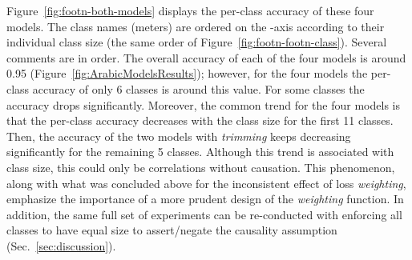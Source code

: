 \documentclass[journal,10pt,twocolumns,letter]{IEEEtran}
\begin{document}
Figure~\ref{fig:footn-both-models} displays the per-class accuracy of these four models. The class
names (meters) are ordered on the -axis according to their individual class size (the same order
of Figure~\ref{fig:footn-footn-class}). Several comments are in order. The overall accuracy of each of
the four models is around 0.95 (Figure~\ref{fig:ArabicModelsResults}); however, for the four models
the per-class accuracy of only 6 classes is around this value. For some classes the accuracy drops
significantly. Moreover, the common trend for the four models is that the per-class accuracy
decreases with the class size for the first 11 classes. Then, the accuracy of the two models with
\textit{trimming} keeps decreasing significantly for the remaining 5 classes. Although this
trend is associated with class size, this could only be correlations without causation. This
phenomenon, along with what was concluded above for the inconsistent effect of loss
\textit{weighting}, emphasize the importance of a more prudent design of the \textit{weighting}
function. In addition, the same full set of experiments can be re-conducted with enforcing all
classes to have equal size to assert/negate the causality assumption (Sec.~\ref{sec:discussion}).

\bigskip
\end{document}
